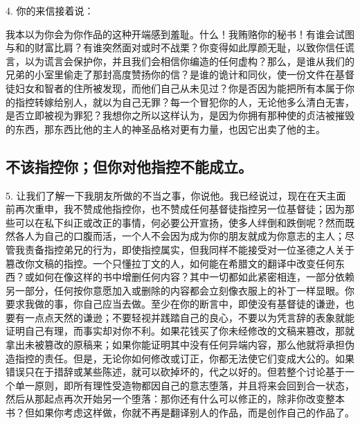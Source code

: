 4. 你的来信接着说：\par

\par

我本以为你会为你作品的这种开端感到羞耻。什么！我贿赂你的秘书！有谁会试图与和的财富比肩？有谁突然面对或时不战栗？你变得如此厚颜无耻，以致你信任谎言，以为谎言会保护你，并且我们会相信你编造的任何虚构？那么，是谁从我们的兄弟的小室里偷走了那封高度赞扬你的信？是谁的诡计和同伙，使一份文件在基督徒妇女和智者的住所被发现，而他们自己从未见过？你是否因为能把所有本属于你的指控转嫁给别人，就以为自己无罪？每一个冒犯你的人，无论他多么清白无害，是否立即被视为罪犯？我想你之所以这样认为，是因为你拥有那种使的贞洁被摧毁的东西，那东西比他的主人的神圣品格对更有力量，也因它出卖了他的主。\par


\subsection{不该指控你；但你对他指控不能成立。}

5. 让我们了解一下我朋友所做的不当之事，你说他。我已经说过，现在在天主面前再次重申，我不赞成他指控你，也不赞成任何基督徒指控另一位基督徒；因为那些可以在私下纠正或改正的事情，何必要公开宣扬，使多人绊倒和跌倒呢？然而既然各人为自己的口腹而活，一个人不会因为成为你的朋友就成为你意志的主人；尽管我责备指控弟兄的行为，即使指控属实，但我同样不能接受对一位圣德之人关于篡改你文稿的指控。一个只懂拉丁文的人，如何能在希腊文的翻译中改变任何东西？或如何在像这样的书中增删任何内容？其中一切都如此紧密相连，一部分依赖另一部分，任何按你意愿加入或删除的内容都会立刻像衣服上的补丁一样显眼。你要求我做的事，你自己应当去做。至少在你的断言中，即使没有基督徒的谦逊，也要有一点点天然的谦逊；不要轻视并践踏自己的良心，不要以为凭言辞的表象就能证明自己有理，而事实却对你不利。如果花钱买了你未经修改的文稿来篡改，那就拿出未被篡改的原稿来；如果你能证明其中没有任何异端内容，那么他就将承担伪造指控的责任。但是，无论你如何修改或订正，你都无法使它们变成大公的。如果错误只在于措辞或某些陈述，就可以砍掉坏的，代之以好的。但若整个讨论基于一个单一原则，即所有理性受造物都因自己的意志堕落，并且将来会回到合一状态，然后从那起点再次开始另一个堕落：那你还有什么可以修正的，除非你改变整本书？但如果你考虑这样做，你就不再是翻译别人的作品，而是创作自己的作品了。\par

